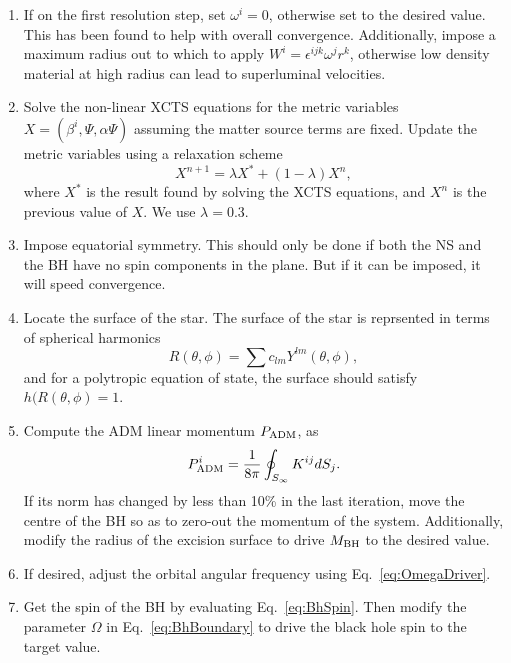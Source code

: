 \begin{enumerate}
\item If on the first resolution step, set $\omega^i=0$, otherwise set
  to the desired value. This has been found to help with overall convergence. Additionally, impose a maximum radius out to which to apply $W^i=\epsilon^{ijk}\omega^jr^k$, otherwise low density material at high radius can lead to superluminal velocities.

\item Solve the non-linear XCTS equations for the metric variables
  $X=\left(\beta^i,\Psi,\alpha\Psi\right)$ assuming the matter source
  terms are fixed. Update the metric variables using a relaxation
  scheme
\begin{equation}
X^{n+1}=\lambda X^{*} + (1-\lambda)X^n,
\end{equation}
where $X^{*}$ is the result found by solving the XCTS equations, and $X^{n}$ is
the previous value of $X$.
We use $\lambda=0.3$.

\item Impose equatorial symmetry. This should only be done if both the
  NS and the BH have no spin components in the plane. But if it can be
  imposed, it will speed convergence.

\item Locate the surface of the star. The surface of the star is
  reprsented in terms of spherical harmonics
\begin{equation}
R(\theta,\phi)=\sum c_{lm}Y^{lm}(\theta,\phi)
,
\end{equation}
and for a polytropic equation of state, the surface
should satisfy $h(R(\theta,\phi)=1$. 

\item Compute the ADM linear momentum $P_{\rm ADM}$, as 
\begin{equation}
P_{\rm ADM}^i = \frac{1}{8\pi}\oint_{S_{\infty}}K^{ij}dS_j.
\end{equation}
If its norm has changed by less than 10\% in the last iteration, move
the centre of the BH so as to zero-out the momentum of the
system. Additionally, modify the radius of the excision surface to
drive $M_{\rm BH}$ to the desired value.

\item If desired, adjust the orbital angular frequency using Eq.~\ref{eq:OmegaDriver}.

\item Get the spin of the BH by evaluating Eq.~\ref{eq:BhSpin}. Then
  modify the parameter $\Omega$ in Eq.~\ref{eq:BhBoundary} to drive
  the black hole spin to the target value.


\end{enumerate}
